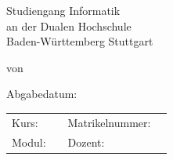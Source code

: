 \documentclass[12pt]{report}
\begin{document}
 
	\begin{titlepage}
		\thispagestyle{titlepage}
		\newcommand\HRule{\rule{\textwidth}{1pt}} %

		
		\begin{center}
			
			\vspace*{2cm}
			
			\begin{spacing}{2}
				{ \huge \bfseries \MakeUppercase{\meinTitel}}
			\end{spacing}
			
			\vspace*{1.5cm}
			
			\Large \artDerArbeit
			
			\vspace*{3cm}
			
			{\LARGE Studiengang Informatik}\\
			{\LARGE an der Dualen Hochschule}\\
			{\LARGE Baden-Württemberg Stuttgart}\\

			\vspace*{2.5cm}
			
			\Large von \meinName
			
			\vspace*{1.5cm}
			
			\Large Abgabedatum: \abgabeDatum

			\begin{table}[bp]
				\begin{tabular}{l l l l}
					Kurs: & \meinKurs & Matrikelnummer: & \meineMatrikelNr  \\
					Modul: & \modul & Dozent: & \dozent\\
				\end{tabular}
			\end{table}
			
			
		\end{center}
		
	\end{titlepage}



\fancypagestyle{plain}{
	\fancyfoot[L]{\meinName\\
		 \meinKurs}
	\fancyfoot[C]{Seite \thepage\ }%
	\fancyfoot[R]{\abgabeDatum}
}
\end{document}
